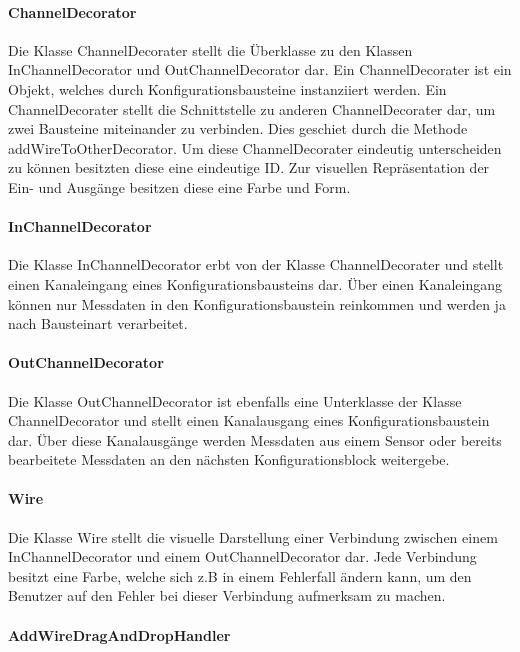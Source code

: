 \documentclass[parskip=full]{scrartcl}
\begin{document}
\paragraph{ChannelDecorator}

Die Klasse ChannelDecorater stellt die Überklasse zu den Klassen InChannelDecorator und OutChannelDecorator dar. 
Ein ChannelDecorater ist ein Objekt, welches durch Konfigurationsbausteine instanziiert werden. Ein ChannelDecorater stellt die Schnittstelle zu anderen ChannelDecorater dar, um zwei Bausteine miteinander zu verbinden. Dies geschiet durch die Methode addWireToOtherDecorator. Um diese ChannelDecorater eindeutig unterscheiden zu können besitzten diese eine eindeutige ID. Zur visuellen Repräsentation der Ein- und Ausgänge besitzen diese eine Farbe und Form.

\paragraph{InChannelDecorator}

Die Klasse InChannelDecorator erbt von der Klasse ChannelDecorater und stellt einen Kanaleingang eines Konfigurationsbausteins dar. Über einen Kanaleingang können nur Messdaten in den Konfigurationsbaustein reinkommen und werden ja nach Bausteinart verarbeitet. 

\paragraph{OutChannelDecorator}

Die Klasse OutChannelDecorator ist ebenfalls eine Unterklasse der Klasse ChannelDecorator und stellt einen Kanalausgang eines Konfigurationsbaustein dar. Über diese Kanalausgänge werden Messdaten aus einem Sensor oder bereits bearbeitete Messdaten an den nächsten Konfigurationsblock weitergebe.

\paragraph{Wire}

Die Klasse Wire stellt die visuelle Darstellung einer Verbindung zwischen einem InChannelDecorator und einem OutChannelDecorator dar. Jede Verbindung besitzt eine Farbe, welche sich z.B in einem Fehlerfall ändern kann, um den Benutzer auf den Fehler bei dieser Verbindung aufmerksam zu machen.

\paragraph{AddWireDragAndDropHandler}
\end{document}
